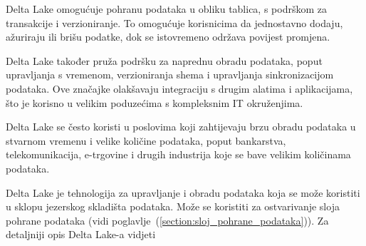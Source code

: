 Delta Lake omogućuje pohranu podataka u obliku tablica, s podrškom za
transakcije i verzioniranje. To omogućuje korisnicima da jednostavno dodaju,
ažuriraju ili brišu podatke, dok se istovremeno održava povijest promjena.

Delta Lake također pruža podršku za naprednu obradu podataka, poput upravljanja
s vremenom, verzioniranja shema i upravljanja sinkronizacijom podataka. Ove
značajke olakšavaju integraciju s drugim alatima i aplikacijama, što je korisno
u velikim poduzećima s kompleksnim IT okruženjima.

Delta Lake se često koristi u poslovima koji zahtijevaju brzu obradu podataka u
stvarnom vremenu i velike količine podataka, poput bankarstva, telekomunikacija,
e-trgovine i drugih industrija koje se bave velikim količinama podataka.

Delta Lake je tehnologija za upravljanje i obradu podataka koja se može
koristiti u sklopu jezerskog skladišta podataka. Može se koristiti za
ostvarivanje sloja pohrane podataka (vidi
poglavlje~(\ref{section:sloj_pohrane_podataka})). Za detaljniji opis Delta
Lake-a vidjeti
\cite{deltalake2023}
